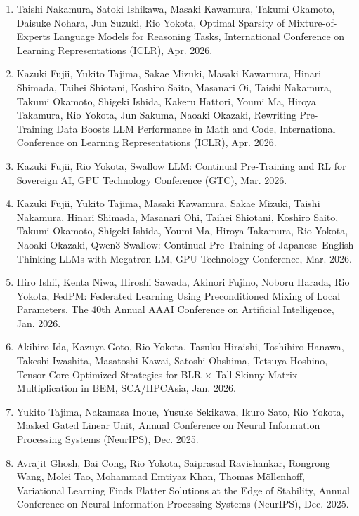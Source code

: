 \documentclass[margin,line]{cv}
\begin{document}
\begin{resume}
\begin{enumerate}
\item Taishi Nakamura, Satoki Ishikawa, Masaki Kawamura, Takumi Okamoto, Daisuke Nohara, Jun Suzuki, Rio Yokota, Optimal Sparsity of Mixture-of-Experts Language Models for Reasoning Tasks, International Conference on Learning Representations (ICLR), Apr. 2026.

\item Kazuki Fujii, Yukito Tajima, Sakae Mizuki, Masaki Kawamura, Hinari Shimada, Taihei Shiotani, Koshiro Saito, Masanari Oi, Taishi Nakamura, Takumi Okamoto, Shigeki Ishida, Kakeru Hattori, Youmi Ma, Hiroya Takamura, Rio Yokota, Jun Sakuma, Naoaki Okazaki, Rewriting Pre-Training Data Boosts LLM Performance in Math and Code, International Conference on Learning Representations (ICLR), Apr. 2026.

\item Kazuki Fujii, Rio Yokota, Swallow LLM: Continual Pre-Training and RL for Sovereign AI, GPU Technology Conference (GTC), Mar. 2026.

\item Kazuki Fujii, Yukito Tajima, Masaki Kawamura, Sakae Mizuki, Taishi Nakamura, Hinari Shimada, Masanari Ohi, Taihei Shiotani, Koshiro Saito, Takumi Okamoto, Shigeki Ishida, Youmi Ma, Hiroya Takamura, Rio Yokota, Naoaki Okazaki, Qwen3-Swallow: Continual Pre-Training of Japanese--English Thinking LLMs with Megatron-LM, GPU Technology Conference, Mar. 2026.

\item Hiro Ishii, Kenta Niwa, Hiroshi Sawada, Akinori Fujino, Noboru Harada, Rio Yokota, FedPM: Federated Learning Using Preconditioned Mixing of Local Parameters, The 40th Annual AAAI Conference on Artificial Intelligence, Jan. 2026.

\item Akihiro Ida, Kazuya Goto, Rio Yokota, Tasuku Hiraishi, Toshihiro Hanawa, Takeshi Iwashita, Masatoshi Kawai, Satoshi Ohshima, Tetsuya Hoshino, Tensor-Core-Optimized Strategies for BLR $\times$ Tall-Skinny Matrix Multiplication in BEM, SCA/HPCAsia, Jan. 2026.

\item Yukito Tajima, Nakamasa Inoue, Yusuke Sekikawa, Ikuro Sato, Rio Yokota, Masked Gated Linear Unit, Annual Conference on Neural Information Processing Systems (NeurIPS), Dec. 2025.

\item Avrajit Ghosh, Bai Cong, Rio Yokota, Saiprasad Ravishankar, Rongrong Wang, Molei Tao, Mohammad Emtiyaz Khan, Thomas M\"{o}llenhoff, Variational Learning Finds Flatter Solutions at the Edge of Stability, Annual Conference on Neural Information Processing Systems (NeurIPS), Dec. 2025.


\end{enumerate}
\end{resume}
\end{document}
